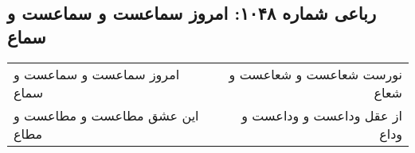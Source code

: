 \begin{center}
\section*{رباعی شماره ۱۰۴۸: امروز سماعست و سماعست و سماع}
\label{sec:1048}
\begin{longtable}{l p{0.5cm} r}
امروز سماعست و سماعست و سماع
&&
نورست شعاعست و شعاعست و شعاع
\\
این عشق مطاعست و مطاعست و مطاع
&&
از عقل وداعست و وداعست و وداع
\\
\end{longtable}
\end{center}
